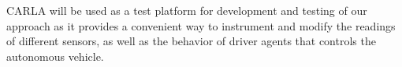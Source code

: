 CARLA will be used as a test platform for development and testing of our approach as it provides a convenient way to instrument and modify the readings of different sensors, as well as the behavior of driver agents that controls the autonomous vehicle. 

